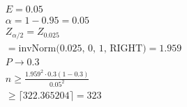 \documentclass{article}
\newcommand{\ceil}[1]{\lceil {#1} \rceil}
\begin{document}
\begin{enumerate}[label=(\alph*)]
          \begin{align*}
              E = 0.05                                         \\
              \alpha = 1 - 0.95 = 0.05                         \\
              Z_{\alpha/2} = Z_{0.025}                         \\
              = \text{invNorm(0.025, 0, 1, RIGHT)} = 1.959     \\
              P \rightarrow 0.3                                \\
              n \geq \frac{1.959^2 \cdot 0.3(1 - 0.3)}{0.05^2} \\
              \geq \ceil{322.365204} = 323
          \end{align*}
\end{enumerate}
\end{document}

